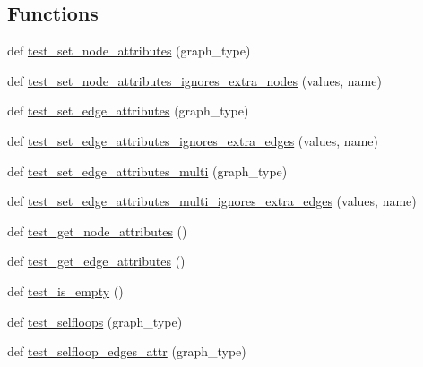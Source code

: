 \subsection*{Functions}
\begin{DoxyCompactItemize}
\item 
def \hyperlink{namespacenetworkx_1_1classes_1_1tests_1_1test__function_a9ef60012f9104785ad5d8921b42f5a98}{test\+\_\+set\+\_\+node\+\_\+attributes} (graph\+\_\+type)
\item 
def \hyperlink{namespacenetworkx_1_1classes_1_1tests_1_1test__function_a7b6ce7931f9e2d7309a9f11a2cd8142d}{test\+\_\+set\+\_\+node\+\_\+attributes\+\_\+ignores\+\_\+extra\+\_\+nodes} (values, name)
\item 
def \hyperlink{namespacenetworkx_1_1classes_1_1tests_1_1test__function_a2d822833f3e3890c3383b43bda955191}{test\+\_\+set\+\_\+edge\+\_\+attributes} (graph\+\_\+type)
\item 
def \hyperlink{namespacenetworkx_1_1classes_1_1tests_1_1test__function_a3799325ab8cb7f26bc76982f6fccd19b}{test\+\_\+set\+\_\+edge\+\_\+attributes\+\_\+ignores\+\_\+extra\+\_\+edges} (values, name)
\item 
def \hyperlink{namespacenetworkx_1_1classes_1_1tests_1_1test__function_ae8d976aeda131a282964a6dd2dc94a79}{test\+\_\+set\+\_\+edge\+\_\+attributes\+\_\+multi} (graph\+\_\+type)
\item 
def \hyperlink{namespacenetworkx_1_1classes_1_1tests_1_1test__function_a90e48ea1cf15242823a3cae74a4d4e19}{test\+\_\+set\+\_\+edge\+\_\+attributes\+\_\+multi\+\_\+ignores\+\_\+extra\+\_\+edges} (values, name)
\item 
def \hyperlink{namespacenetworkx_1_1classes_1_1tests_1_1test__function_a2f24033beafc93b84c0185d317d84986}{test\+\_\+get\+\_\+node\+\_\+attributes} ()
\item 
def \hyperlink{namespacenetworkx_1_1classes_1_1tests_1_1test__function_ae9f4e44d237d87bd6ca9bc5aca7a080a}{test\+\_\+get\+\_\+edge\+\_\+attributes} ()
\item 
def \hyperlink{namespacenetworkx_1_1classes_1_1tests_1_1test__function_afc2f7b7b7415fc1ef9f8eabeac3b3dd7}{test\+\_\+is\+\_\+empty} ()
\item 
def \hyperlink{namespacenetworkx_1_1classes_1_1tests_1_1test__function_ad3e9add41182135ced7c0c51b67273db}{test\+\_\+selfloops} (graph\+\_\+type)
\item 
def \hyperlink{namespacenetworkx_1_1classes_1_1tests_1_1test__function_a0efb21f4c0cdd3042ff2bb1a97076451}{test\+\_\+selfloop\+\_\+edges\+\_\+attr} (graph\+\_\+type)

\end{DoxyCompactItemize}
